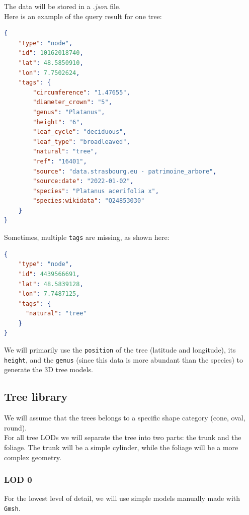 \documentclass[12pt]{article}
\begin{document}
The data will be stored in a \textit{.json} file. \\
Here is an example of the query result for one tree:

\begin{lstlisting}[language=json]
{
    "type": "node",
    "id": 10162018740,
    "lat": 48.5850910,
    "lon": 7.7502624,
    "tags": {
        "circumference": "1.47655",
        "diameter_crown": "5",
        "genus": "Platanus",
        "height": "6",
        "leaf_cycle": "deciduous",
        "leaf_type": "broadleaved",
        "natural": "tree",
        "ref": "16401",
        "source": "data.strasbourg.eu - patrimoine_arbore",
        "source:date": "2022-01-02",
        "species": "Platanus acerifolia x",
        "species:wikidata": "Q24853030"
    }
}
\end{lstlisting}

Sometimes, multiple \texttt{tags} are missing, as shown here:

\begin{lstlisting}[language=json]
{
    "type": "node",
    "id": 4439566691,
    "lat": 48.5839128,
    "lon": 7.7487125,
    "tags": {
      "natural": "tree"
    }
}
\end{lstlisting}

We will primarily use the \texttt{position} of the tree (latitude and
longitude), its \texttt{height}, and the \texttt{genus} (since this data is
more abundant than the species) to generate the 3D tree models.

\subsection{Tree library}
We will assume that the trees belongs to a specific shape category (cone, oval, round). \\
For all tree LODs we will separate the tree into two parts: the trunk and the
foliage. The trunk will be a simple cylinder, while the foliage will be a more 
complex geometry. \\

\subsubsection{LOD 0}
For the lowest level of detail, we will use simple models manually made with 
\texttt{Gmsh}\cite{gmsh}.
\end{document}
